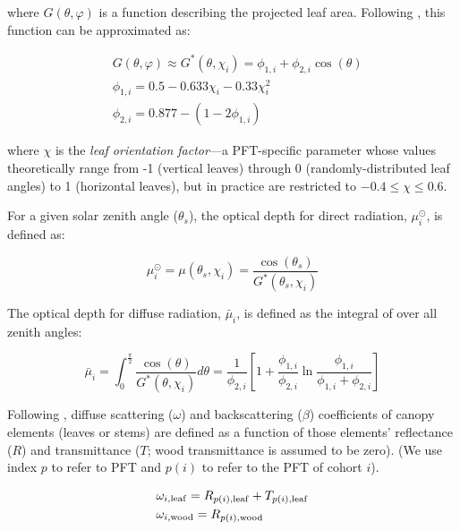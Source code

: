 where $G(\theta, \varphi)$ is a function describing the projected leaf area.
Following \citet{goudriaan_1977_crop}, this function can be approximated as:

\begin{align}
  & G(\theta, \varphi) \approx G^*(\theta, \chi_{i}) = \phi_{1, i} + \phi_{2, i} \cos(\theta) \label{eqn:gfunction} \\
  & \phi_{1, i} = 0.5 - 0.633 \chi_{i} - 0.33 \chi_{i}^{2} \\
  & \phi_{2, i} = 0.877 - \left( 1 - 2 \phi_{1, i} \right)
\end{align}

where $\chi$ is the \emph{leaf orientation factor}---a PFT-specific parameter whose values theoretically range from -1 (vertical leaves) through 0 (randomly-distributed leaf angles) to 1 (horizontal leaves), but in practice are restricted to $-0.4 \leq \chi \leq 0.6$.

For a given solar zenith angle ($\theta_{s}$), the optical depth for direct radiation, $\mu^{\odot}_{i}$, is defined as:

\begin{equation}
  \mu^{\odot}_{i} = \mu(\theta_{s}, \chi_{i}) = \frac{\cos(\theta_{s})}{G^{*}(\theta_{s}, \chi_{i})}
\end{equation}

The optical depth for diffuse radiation, $\bar{\mu}_{i}$, is defined as the integral of \label{eqn:opticaldepth} over all zenith angles:

\begin{equation}
  \bar{\mu}_{i} = \int_{0}^{\frac{\pi}{2}} \frac{\cos(\theta)}{G^{*}(\theta, \chi_{i})} d\theta
  = \frac{1}{\phi_{2,i}} \left[ 1 + \frac{\phi_{1, i}}{\phi_{2, i}} \ln \frac{\phi_{1, i}}{\phi_{1, i} + \phi_{2, i}} \right]
\end{equation}

Following \citet{sellers1985canopy}, diffuse scattering ($\omega$) and backscattering ($\beta$) coefficients of canopy elements (leaves or stems) are defined as a function of those elements' reflectance ($R$) and transmittance ($T$; wood transmittance is assumed to be zero).
(We use index $p$ to refer to PFT and $p(i)$ to refer to the PFT of cohort $i$).

\begin{align}
  & \omega_{i, \mathrm{leaf}} = R_{p(i), \mathrm{leaf}} + T_{p(i), \mathrm{leaf}}\\
  & \omega_{i, \mathrm{wood}} = R_{p(i), \mathrm{wood}}
\end{align}

